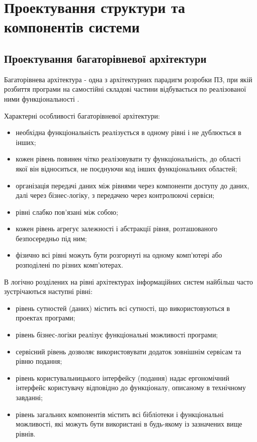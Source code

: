 \section{Проектування структури та компонентів системи}

\subsection{Проектування багаторівневої архітектури}

Багаторівнева архітектура - одна з архітектурних парадигм розробки ПЗ,
при якій розбиття програми на самостійні складові частини відбувається
по реалізованої ними функціональності \cite{multitier-thesis}.

Характерні особливості багаторівневої архітектури:
\begin{itemize}
		\item необхідна функціональність реалізується в одному рівні і не дублюється в інших;
		\item кожен рівень повинен чітко реалізовувати ту функціональність,
			до області якої він відноситься, не поєднуючи код інших функціональних областей;
		\item організація передачі даних між рівнями через компоненти доступу до даних,
			далі через бізнес-логіку, з передачею через контролюючі сервіси;
		\item рівні слабко пов'язані між собою;
		\item кожен рівень агрегує залежності і абстракції рівня,
			розташованого безпосередньо під ним;
		\item фізично всі рівні можуть бути розгорнуті на одному комп'ютері або
			розподілені по різних комп'ютерах.
\end{itemize}

В логічно розділених на рівні архітектурах інформаційних систем найбільш
часто зустрічаються наступні рівні:

\begin{itemize}
		\item рівень сутностей (даних) містить всі сутності, що використовуються в проектах програми;
		\item рівень бізнес-логіки реалізує функціональні можливості програми;
		\item сервісний рівень дозволяє використовувати додаток зовнішнім сервісам та рівню подання;
		\item рівень користувальницького інтерфейсу (подання) надає ергономічний інтерфейс користувачу
			відповідно до функціоналу, описаному в технічному завданні;
		\item рівень загальних компонентів містить всі бібліотеки і функціональні можливості,
			які можуть бути використані в будь-якому із зазначених вище рівнів.
\end{itemize}


